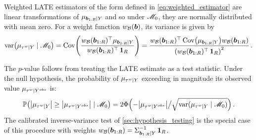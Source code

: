 \documentclass[12pt]{article}
\begin{document}
\begin{appendices}
Weighted LATE estimators of the form defined in \autoref{eq:weighted_estimator} are linear transformations of \(\mu_{\bm{b}_{1:R} \mid Y}\) and so under \(\mathscr{M}_0\), they are normally distributed with mean zero.
For a weight function \(w_{\mathcal{B}}(\bm{b})\), its variance is given by
\begin{equation}
        \var\del{\mu_{\tauw \mid Y} \mid \modnull} = \cov\del{ \frac{\weightb(\sentinels)\trans \mu_{\sentinels \mid Y}}{ \weightb(\sentinels)\trans\ones_{\numsent}}}
        = \frac{\weightb(\sentinels) \trans \cov \del{\mu_{\sentinels \mid Y}} \weightb(\sentinels)}{\del{ \weightb(\sentinels)\trans\ones_{\numsent}}^2}
        \,.
\end{equation}

The \(p\)-value follows from treating the LATE estimate as a test statistic.
Under the null hypothesis, the probability of \(\mu_{\tau^{w} \mid Y}\) exceeding in magnitude its observed value \(\mu_{\tau^{w} \mid Y^{obs}}\) is:
\begin{equation}
    \Pr\del{ \abs{\mu_{\tauw \mid Y}} \ge \abs{\mu_{\tauw \mid Y^{obs}}} \mid \modnull} = 2 \Phi\del{ -\abs{\mu_{\tauw \mid Y^{obs}}} \big/ {\sqrt{\var({\mu_{\tauw \mid Y} \mid \modnull})}} }\,.
\end{equation}
The calibrated inverse-variance test of \autoref{sec:hypothesis_testing} is the special case of this procedure with weights \(w_{\mathcal{B}}(\bm{b}_{1:R}) = \Sigma^{-1}_{\bm{b}_{1:R} \mid Y} \operatorname{\mathbf{1}}_{R}\).

\end{appendices}
\end{document}

